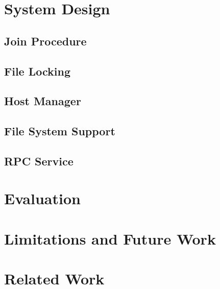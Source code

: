 \documentclass[preprint]{sig-alternate-10pt}
\begin{document}
\section{System Design}
\label{sec:designOverview}


%    

\subsection{Join Procedure}
\label{sec:joinProcedure}


\subsection{File Locking}
\label{sec:fileLocking}


\subsection{Host Manager}
\label{sec:hostManager}


\subsection{File System Support}
\label{sec:fsSupport}


\subsection{RPC Service}
\label{sec:rpcService}


\section{Evaluation}
\label{sec:evaluation}


\section{Limitations and Future Work}
\label{sec:limitations}


\section{Related Work}
\label{sec:relatedWork}

\end{document}
